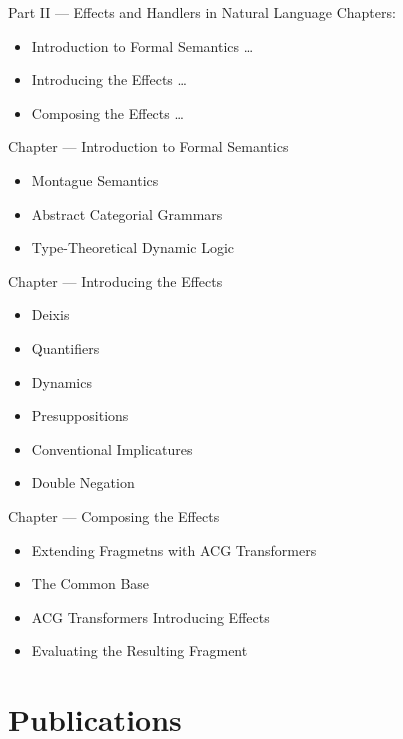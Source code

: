 \documentclass{beamer}
\begin{document}
\begin{frame}{Part II --- Effects and Handlers in Natural Language}
  Chapters:
  \begin{itemize}
  \item Introduction to Formal Semantics \ldots
  \item Introducing the Effects \ldots
  \item Composing the Effects \ldots
  \end{itemize}
\end{frame}

\begin{frame}{Chapter --- Introduction to Formal Semantics}
  \begin{itemize}
  \item Montague Semantics
  \item Abstract Categorial Grammars
  \item Type-Theoretical Dynamic Logic
  \end{itemize}
\end{frame}

\begin{frame}{Chapter --- Introducing the Effects}
  \begin{itemize}
  \item Deixis
  \item Quantifiers
  \item Dynamics
  \item Presuppositions
  \item Conventional Implicatures
  \item Double Negation
  \end{itemize}
\end{frame}

\begin{frame}{Chapter --- Composing the Effects}
  \begin{itemize}
  \item Extending Fragmetns with ACG Transformers
  \item The Common Base
  \item ACG Transformers Introducing Effects
  \item Evaluating the Resulting Fragment
  \end{itemize}
\end{frame}

\section{Publications}
\end{document}
